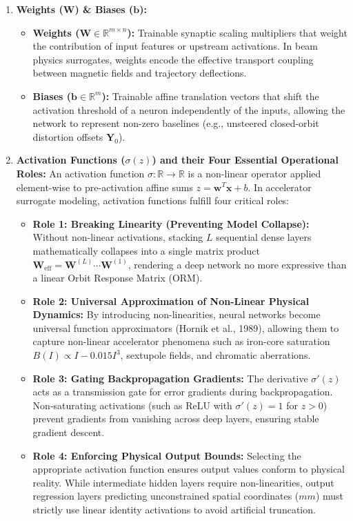 \documentclass[11pt,a4paper]{article}
\begin{document}
\begin{enumerate}
    \item \textbf{Weights ($\mathbf{W}$) \& Biases ($\mathbf{b}$):}
    \begin{itemize}
        \item \textbf{Weights ($\mathbf{W} \in \mathbb{R}^{m \times n}$):} Trainable synaptic scaling multipliers that weight the contribution of input features or upstream activations. In beam physics surrogates, weights encode the effective transport coupling between magnetic fields and trajectory deflections.
        \item \textbf{Biases ($\mathbf{b} \in \mathbb{R}^m$):} Trainable affine translation vectors that shift the activation threshold of a neuron independently of the inputs, allowing the network to represent non-zero baselines (e.g., unsteered closed-orbit distortion offsets $\mathbf{Y}_0$).
    \end{itemize}

    \item \textbf{Activation Functions ($\sigma(z)$) and their Four Essential Operational Roles:}
    An activation function $\sigma: \mathbb{R} \to \mathbb{R}$ is a non-linear operator applied element-wise to pre-activation affine sums $z = \mathbf{w}^T \mathbf{x} + b$. In accelerator surrogate modeling, activation functions fulfill four critical roles:
    \begin{itemize}
        \item \textbf{Role 1: Breaking Linearity (Preventing Model Collapse):} Without non-linear activations, stacking $L$ sequential dense layers mathematically collapses into a single matrix product $\mathbf{W}_{\text{eff}} = \mathbf{W}^{(L)} \cdots \mathbf{W}^{(1)}$, rendering a deep network no more expressive than a linear Orbit Response Matrix (ORM).
        \item \textbf{Role 2: Universal Approximation of Non-Linear Physical Dynamics:} By introducing non-linearities, neural networks become universal function approximators (Hornik et al., 1989), allowing them to capture non-linear accelerator phenomena such as iron-core saturation $B(I) \propto I - 0.015 I^3$, sextupole fields, and chromatic aberrations.
        \item \textbf{Role 3: Gating Backpropagation Gradients:} The derivative $\sigma'(z)$ acts as a transmission gate for error gradients during backpropagation. Non-saturating activations (such as ReLU with $\sigma'(z) = 1$ for $z > 0$) prevent gradients from vanishing across deep layers, ensuring stable gradient descent.
        \item \textbf{Role 4: Enforcing Physical Output Bounds:} Selecting the appropriate activation function ensures output values conform to physical reality. While intermediate hidden layers require non-linearities, output regression layers predicting unconstrained spatial coordinates ($mm$) must strictly use linear identity activations to avoid artificial truncation.
    \end{itemize}


\end{enumerate}
\end{document}
